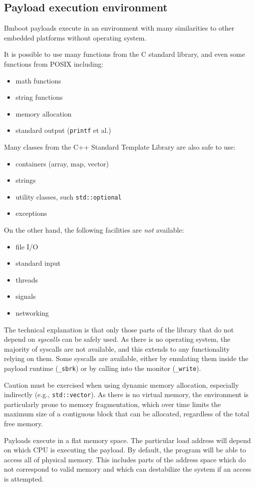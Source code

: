 \subsection{Payload execution environment}

Bmboot payloads execute in an environment with many similarities to other embedded platforms without operating system.

It is possible to use many functions from the C standard library, and even some functions from POSIX including:

\begin{itemize}
    \item math functions
    \item string functions
    \item memory allocation
    \item standard output (\texttt{printf} et al.)
\end{itemize}

Many classes from the C++ Standard Template Library are also safe to use:

\begin{itemize}
    \item containers (array, map, vector)
    \item strings
    \item utility classes, such \texttt{std::optional}
    \item exceptions
\end{itemize}

On the other hand, the following facilities are \textit{not} available:

\begin{itemize}
    \item file I/O
    \item standard input
    \item threads
    \item signals
    \item networking
\end{itemize}

The technical explanation is that only those parts of the library that do not depend on \textit{syscalls} can be safely used. As there is no operating system, the majority of syscalls are not available, and this extends to any functionality relying on them. Some syscalls are available, either by emulating them inside the payload runtime (\texttt{\_sbrk}) or by calling into the monitor (\texttt{\_write}).

Caution must be exercised when using dynamic memory allocation, especially indirectly (e.g., \texttt{std::vector}). As there is no virtual memory, the environment is particularly prone to memory fragmentation, which over time limits the maximum size of a contiguous block that can be allocated, regardless of the total free memory.

Payloads execute in a flat memory space. The particular load address will depend on which CPU is executing the payload. By default, the program will be able to access all of physical memory. This includes parts of the address space which do not correspond to valid memory and which can destabilize the system if an access is attempted.
